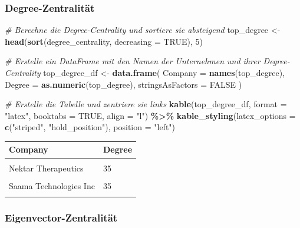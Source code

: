 \documentclass[
]{article}
\newenvironment{Shaded}{\begin{snugshade}}{\end{snugshade}}
\newcommand{\AttributeTok}[1]{\textcolor[rgb]{0.13,0.29,0.53}{#1}}
\newcommand{\CommentTok}[1]{\textcolor[rgb]{0.56,0.35,0.01}{\textit{#1}}}
\newcommand{\ConstantTok}[1]{\textcolor[rgb]{0.56,0.35,0.01}{#1}}
\newcommand{\DecValTok}[1]{\textcolor[rgb]{0.00,0.00,0.81}{#1}}
\newcommand{\FunctionTok}[1]{\textcolor[rgb]{0.13,0.29,0.53}{\textbf{#1}}}
\newcommand{\NormalTok}[1]{#1}
\newcommand{\OtherTok}[1]{\textcolor[rgb]{0.56,0.35,0.01}{#1}}
\newcommand{\SpecialCharTok}[1]{\textcolor[rgb]{0.81,0.36,0.00}{\textbf{#1}}}
\newcommand{\StringTok}[1]{\textcolor[rgb]{0.31,0.60,0.02}{#1}}
\begin{document}
\subsubsection{Degree-Zentralität}\label{degree-zentralituxe4t}

\begin{Shaded}
\begin{Highlighting}[]
\CommentTok{\# Berechne die Degree{-}Centrality und sortiere sie absteigend}
\NormalTok{top\_degree }\OtherTok{\textless{}{-}} \FunctionTok{head}\NormalTok{(}\FunctionTok{sort}\NormalTok{(degree\_centrality, }\AttributeTok{decreasing =} \ConstantTok{TRUE}\NormalTok{), }\DecValTok{5}\NormalTok{)}

\CommentTok{\# Erstelle ein DataFrame mit den Namen der Unternehmen und ihrer Degree{-}Centrality}
\NormalTok{top\_degree\_df }\OtherTok{\textless{}{-}} \FunctionTok{data.frame}\NormalTok{(}
  \AttributeTok{Company =} \FunctionTok{names}\NormalTok{(top\_degree),}
  \AttributeTok{Degree =} \FunctionTok{as.numeric}\NormalTok{(top\_degree),}
  \AttributeTok{stringsAsFactors =} \ConstantTok{FALSE}
\NormalTok{)}

\CommentTok{\# Erstelle die Tabelle und zentriere sie links}
\FunctionTok{kable}\NormalTok{(top\_degree\_df, }\AttributeTok{format =} \StringTok{"latex"}\NormalTok{, }\AttributeTok{booktabs =} \ConstantTok{TRUE}\NormalTok{, }\AttributeTok{align =} \StringTok{"l"}\NormalTok{) }\SpecialCharTok{\%\textgreater{}\%}
  \FunctionTok{kable\_styling}\NormalTok{(}\AttributeTok{latex\_options =} \FunctionTok{c}\NormalTok{(}\StringTok{"striped"}\NormalTok{, }\StringTok{"hold\_position"}\NormalTok{), }\AttributeTok{position =} \StringTok{"left"}\NormalTok{)}
\end{Highlighting}
\end{Shaded}

\begin{tabular}{ll}
\toprule
Company & Degree\\
\midrule
\cellcolor{gray!10}{New England Biolabs} & \cellcolor{gray!10}{35}\\
Nektar Therapeutics & 35\\
\cellcolor{gray!10}{Sunovion} & \cellcolor{gray!10}{35}\\
Saama Technologies Inc & 35\\
\cellcolor{gray!10}{IQVIA} & \cellcolor{gray!10}{35}\\
\bottomrule
\end{tabular}

\subsubsection{Eigenvector-Zentralität}\label{eigenvector-zentralituxe4t}
\end{document}
